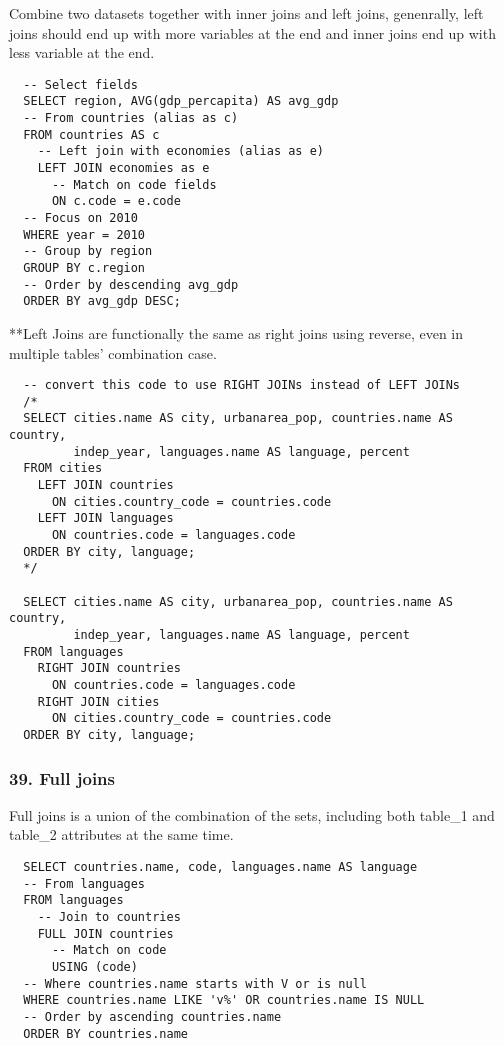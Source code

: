 \documentclass[
]{article}
\begin{document}
Combine two datasets together with inner joins and left joins,
genenrally, left joins should end up with more variables at the end and
inner joins end up with less variable at the end.

\begin{verbatim}
  -- Select fields
  SELECT region, AVG(gdp_percapita) AS avg_gdp
  -- From countries (alias as c)
  FROM countries AS c
    -- Left join with economies (alias as e)
    LEFT JOIN economies as e
      -- Match on code fields
      ON c.code = e.code
  -- Focus on 2010
  WHERE year = 2010
  -- Group by region
  GROUP BY c.region
  -- Order by descending avg_gdp
  ORDER BY avg_gdp DESC;
\end{verbatim}

**Left Joins are functionally the same as right joins using reverse,
even in multiple tables' combination case.

\begin{verbatim}
  -- convert this code to use RIGHT JOINs instead of LEFT JOINs
  /*
  SELECT cities.name AS city, urbanarea_pop, countries.name AS country,
         indep_year, languages.name AS language, percent
  FROM cities
    LEFT JOIN countries
      ON cities.country_code = countries.code
    LEFT JOIN languages
      ON countries.code = languages.code
  ORDER BY city, language;
  */
  
  SELECT cities.name AS city, urbanarea_pop, countries.name AS country,
         indep_year, languages.name AS language, percent
  FROM languages
    RIGHT JOIN countries
      ON countries.code = languages.code
    RIGHT JOIN cities
      ON cities.country_code = countries.code
  ORDER BY city, language;
\end{verbatim}

\hypertarget{full-joins}{%
\subsubsection{39. Full joins}\label{full-joins}}

Full joins is a union of the combination of the sets, including both
table\_1 and table\_2 attributes at the same time.

\begin{verbatim}
  SELECT countries.name, code, languages.name AS language
  -- From languages
  FROM languages 
    -- Join to countries
    FULL JOIN countries
      -- Match on code
      USING (code)
  -- Where countries.name starts with V or is null
  WHERE countries.name LIKE 'v%' OR countries.name IS NULL
  -- Order by ascending countries.name
  ORDER BY countries.name
\end{verbatim}
\end{document}
